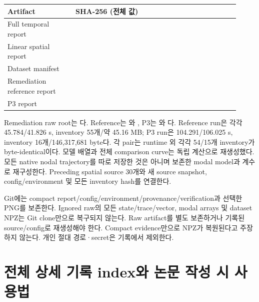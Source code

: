 \documentclass[10pt]{article}
\begin{document}
\begin{longtable}{L{0.27\linewidth}L{0.65\linewidth}}
\toprule Artifact & SHA-256 (전체 값)\\\midrule
Full temporal report & \\
Linear spatial report & \\
Dataset manifest & \\
Remediation reference report & \\
P3 report & \\
\bottomrule\end{longtable}

Remediation raw root는 다.
Reference는 와 ,
P3는 와 다.
Reference run은 각각 45.784/41.826 s, inventory 55개/약 45.16 MB;
P3 run은 104.291/106.025 s, inventory 16개/146,317,681 byte다.
각 pair는 runtime 외 각각 54/15개 inventory가 byte-identical이다.
모델 배열과 전체 comparison curve는 독립 계산으로 재생성했다.
모든 native nodal trajectory를 따로 저장한 것은 아니며 보존한 modal model과 계수로 재구성한다.
Preceding spatial source 30개와 새 source snapshot, config/environment 및 모든 inventory hash를 연결한다.

Git에는 compact report/config/environment/provenance/verification과 선택한 PNG를 보존한다.
Ignored raw의 모든 state/trace/vector, modal arrays 및 dataset NPZ는 Git clone만으로 복구되지 않는다.
Raw artifact를 별도 보존하거나 기록된 source/config로 재생성해야 한다. Compact evidence만으로
NPZ가 복원된다고 주장하지 않는다. 개인 절대 경로·secret은 기록에서 제외한다.

\section{전체 상세 기록 index와 논문 작성 시 사용법}
\end{document}
